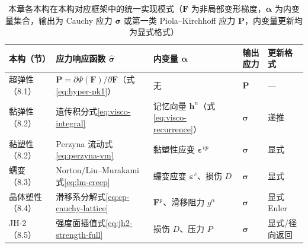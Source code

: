 \begin{table}[htbp]
  \centering
  \small
  \caption{本章各本构在本构对应框架中的统一实现模式（$\mathbf{F}$ 为非局部变形梯度，$\boldsymbol{\alpha}$ 为内变量集合，输出为 Cauchy 应力 $\boldsymbol{\sigma}$ 或第一类 Piola--Kirchhoff 应力 $\mathbf{P}$，内变量更新均为显式格式）}
  \label{tab:fd-constitutive-summary}
  \begin{tabular}{>{\raggedright\arraybackslash}p{}>{\raggedright\arraybackslash}p{}>{\raggedright\arraybackslash}p{}>{\raggedright\arraybackslash}p{}>{\raggedright\arraybackslash}p{}}
    \toprule
    本构（节） & 应力响应函数 $\hat{\boldsymbol{\sigma}}$ & 内变量 $\boldsymbol{\alpha}$ & 输出应力 & 更新格式 \\
    \midrule
    超弹性（8.1） & $\mathbf{P}=\partial\Psi(\mathbf{F})/\partial\mathbf{F}$（式\eqref{eq:hyper-pk1}） & 无 & $\mathbf{P}$ & — \\
    黏弹性（8.2） & 遗传积分式\eqref{eq:visco-integral} & 记忆向量 $\mathbf{h}^{n}$（式\eqref{eq:visco-recurrence}） & $\boldsymbol{\sigma}$ & 递推 \\
    黏塑性（8.2） & Perzyna 流动式\eqref{eq:perzyna-vm} & 黏塑性应变 $\boldsymbol{\varepsilon}^{vp}$ & $\boldsymbol{\sigma}$ & 显式 \\
    蠕变（8.3） & Norton/Liu--Murakami 式\eqref{eq:lm-creep} & 蠕变应变 $\boldsymbol{\varepsilon}^{c}$、损伤 $D$ & $\boldsymbol{\sigma}$ & 显式 \\
    晶体塑性（8.4） & 滑移系分解式\eqref{eq:cp-cauchy-lattice} & $\mathbf{F}^{\mathrm{p}}$、滑移阻力 $g^{\alpha}$ & $\boldsymbol{\sigma}$ & 显式 Euler \\
    JH-2（8.5） & 强度面插值式\eqref{eq:jh2-strength-full} & 损伤 $D$、压力 $P$ & $\boldsymbol{\sigma}$ & 显式/径向返回 \\
    \bottomrule
  \end{tabular}
\end{table}

